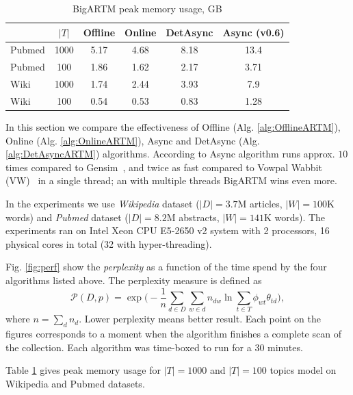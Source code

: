 \documentclass[russian,english]{llncs}
\newcommand{\kw}[1]{\mbox{\textsf{#1}}}
\begin{document}
\begin{table}[t]
	\caption{
		BigARTM peak memory usage, GB
	}
	\label{tab:memory}
	\centering\tabcolsep=4.3pt
	\begin{tabular}[t]{|l|ccccc|}
		\hline
		& $|T|$ & Offline   & Online    & DetAsync     & Async (\kw{v0.6})  \\
		\hline
		Pubmed & {1000}	& {5.17}   	& {4.68}   	& {8.18}   	& {13.4}      \\
		Pubmed & {100}	& {1.86}   	& {1.62}   	& {2.17}   	& {3.71}      \\
		Wiki   & {1000}	& {1.74}   	& {2.44}   	& {3.93}   	& {7.9}       \\ 
		Wiki   & {100}	& {0.54}   	& {0.53}   	& {0.83}   	& {1.28}       \\ 
		\hline
	\end{tabular}
\end{table}

In this section we compare the effectiveness of
\kw{Offline} (Alg. \ref{alg:OfflineARTM}),
\kw{Online} (Alg. \ref{alg:OnlineARTM}),
\kw{Async} \cite{vfardi15aist} and
\kw{DetAsync} (Alg. \ref{alg:DetAsyncARTM}) algorithms.
According to \cite{vfardi15aist} \kw{Async} algorithm
runs approx. $10$ times compared to Gensim~\cite{rehurek10software},
and twice as fast compared to
Vowpal Wabbit (VW)~\cite{langford07vw}
in a single thread;
an with multiple threads BigARTM wins even more.

In the experiments we use \emph{Wikipedia} dataset ($|D| = 3.7$M articles, $|W| = 100$K words)
and \emph{Pubmed} dataset ($|D| = 8.2$M abstracts, $|W| = 141$K words).
The experiments ran on Intel Xeon CPU E5-2650 v2 system with 2 processors, 16 physical cores in total (32 with hyper-threading).


Fig. \ref{fig:perf} show the \emph{perplexity} as a function of the time spend by the four algorithms listed above.
The perplexity measure is defined as
\begin{equation}
\label{eq:perplexity}
\mathscr{P}(D, p) =
\exp \biggl( - \frac{1}{n} \sum_{d \in D} \sum_{w \in d} n_{dw} \ln \sum_{t\in T} \phi_{wt} \theta_{td} \biggr),
\end{equation}
 where $n = \sum_d n_d$. Lower perplexity means better result.
Each point on the figures corresponds to a moment when the algorithm finishes a complete scan of the collection.
Each algorithm was time-boxed to run for a 30 minutes.

Table \ref{tab:memory} gives peak memory usage for $|T| = 1000$ and $|T|=100$ topics model on Wikipedia and Pubmed datasets.
\end{document}
